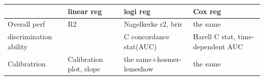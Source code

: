 \documentclass[]{book}
\begin{document}
\begin{longtable}[]{@{}llll@{}}
\toprule
\begin{minipage}[b]{0.02\columnwidth}\raggedright\strut
\strut
\end{minipage} & \begin{minipage}[b]{0.02\columnwidth}\raggedright\strut
linear reg\strut
\end{minipage} & \begin{minipage}[b]{0.02\columnwidth}\raggedright\strut
logi reg\strut
\end{minipage} & \begin{minipage}[b]{0.02\columnwidth}\raggedright\strut
Cox reg\strut
\end{minipage}\tabularnewline
\midrule
\endhead
\begin{minipage}[t]{0.02\columnwidth}\raggedright\strut
Overall perf\strut
\end{minipage} & \begin{minipage}[t]{0.02\columnwidth}\raggedright\strut
R2\strut
\end{minipage} & \begin{minipage}[t]{0.02\columnwidth}\raggedright\strut
Nagelkerke r2, brir\strut
\end{minipage} & \begin{minipage}[t]{0.02\columnwidth}\raggedright\strut
the same\strut
\end{minipage}\tabularnewline
\begin{minipage}[t]{0.02\columnwidth}\raggedright\strut
discrimination ability\strut
\end{minipage} & \begin{minipage}[t]{0.02\columnwidth}\raggedright\strut
\strut
\end{minipage} & \begin{minipage}[t]{0.02\columnwidth}\raggedright\strut
C concordance stat(AUC)\strut
\end{minipage} & \begin{minipage}[t]{0.02\columnwidth}\raggedright\strut
Harell C stat, time-dependent AUC\strut
\end{minipage}\tabularnewline
\begin{minipage}[t]{0.02\columnwidth}\raggedright\strut
Calibratrion\strut
\end{minipage} & \begin{minipage}[t]{0.02\columnwidth}\raggedright\strut
Calibration plot, slope\strut
\end{minipage} & \begin{minipage}[t]{0.02\columnwidth}\raggedright\strut
the same+hosmer-lemeshow\strut
\end{minipage} & \begin{minipage}[t]{0.02\columnwidth}\raggedright\strut
the same\strut
\end{minipage}\tabularnewline
\bottomrule
\end{longtable}
\end{document}

